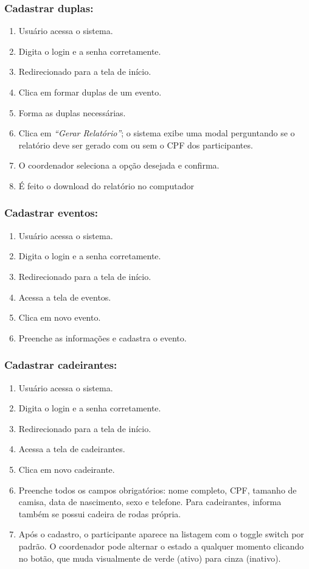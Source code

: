 \documentclass[12pt,a4paper]{article}
\begin{document}
\subsubsection{Cadastrar duplas:}
\begin{enumerate}
    \item Usuário acessa o sistema.
    \item Digita o login e a senha corretamente.
    \item Redirecionado para a tela de início.
    \item Clica em formar duplas de um evento.
    \item Forma as duplas necessárias.
    \item Clica em \textit{``Gerar Relatório''}; o sistema exibe uma modal perguntando se o relatório deve ser gerado com ou sem o CPF dos participantes.
    \item O coordenador seleciona a opção desejada e confirma.
    \item É feito o download do relatório no computador
\end{enumerate}

\subsubsection{Cadastrar eventos:}
\begin{enumerate}
    \item Usuário acessa o sistema.
    \item Digita o login e a senha corretamente.
    \item Redirecionado para a tela de início.
    \item Acessa a tela de eventos.
    \item Clica em novo evento.
    \item Preenche as informações e cadastra o evento.
\end{enumerate}

\subsubsection{Cadastrar cadeirantes:}
\begin{enumerate}
    \item Usuário acessa o sistema.
    \item Digita o login e a senha corretamente.
    \item Redirecionado para a tela de início.
    \item Acessa a tela de cadeirantes.
    \item Clica em novo cadeirante.
    \item Preenche todos os campos obrigatórios: nome completo, CPF, tamanho de camisa, data de nascimento, sexo e telefone. Para cadeirantes, informa também se possui cadeira de rodas própria.
    \item Após o cadastro, o participante aparece na listagem com o toggle switch  por padrão. O coordenador pode alternar o estado a qualquer momento clicando no botão, que muda visualmente de verde (ativo) para cinza (inativo).
\end{enumerate}
\end{document}
